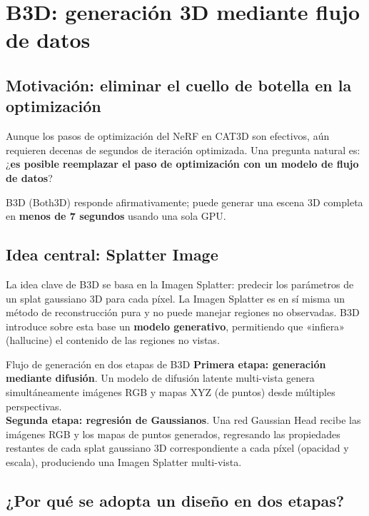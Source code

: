 \section{B3D: generación 3D mediante flujo de datos}

\subsection{Motivación: eliminar el cuello de botella en la optimización}

Aunque los pasos de optimización del NeRF en CAT3D son efectivos, aún requieren decenas de segundos de iteración optimizada. Una pregunta natural es: ¿\textbf{es posible reemplazar el paso de optimización con un modelo de flujo de datos}?

B3D (Both3D) responde afirmativamente; puede generar una escena 3D completa en \textbf{menos de 7 segundos} usando una sola GPU.

\subsection{Idea central: Splatter Image}

La idea clave de B3D se basa en la Imagen Splatter: predecir los parámetros de un splat gaussiano 3D para cada píxel. La Imagen Splatter es en sí misma un método de reconstrucción pura y no puede manejar regiones no observadas. B3D introduce sobre esta base un \textbf{modelo generativo}, permitiendo que «infiera» (hallucine) el contenido de las regiones no vistas.

\begin{importantbox}{Flujo de generación en dos etapas de B3D}
\textbf{Primera etapa: generación mediante difusión}. Un modelo de difusión latente multi-vista genera simultáneamente imágenes RGB y mapas XYZ (de puntos) desde múltiples perspectivas.\\
\textbf{Segunda etapa: regresión de Gaussianos}. Una red Gaussian Head recibe las imágenes RGB y los mapas de puntos generados, regresando las propiedades restantes de cada splat gaussiano 3D correspondiente a cada píxel (opacidad y escala), produciendo una Imagen Splatter multi-vista.
\end{importantbox}

\subsection{¿Por qué se adopta un diseño en dos etapas?}

